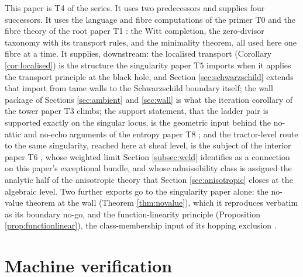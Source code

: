 \documentclass[11pt]{article}
\theoremstyle{definition}
\begin{document}
This paper is T4 of the series. It uses two predecessors and supplies four successors. It uses the language and fibre computations of the primer T0 \cite{ButlerT0} and the fibre theory of the root paper T1 \cite{ButlerT1}: the Witt completion, the zero-divisor taxonomy with its transport rules, and the minimality theorem, all used here one fibre at a time. It supplies, downstream: the localised transport (Corollary \ref{cor:localised}) is the structure the singularity paper T5 \cite{ButlerT5} imports when it applies the transport principle at the black hole, and Section \ref{sec:schwarzschild} extends that import from tame walls to the Schwarzschild boundary itself; the wall package of Sections \ref{sec:ambient} and \ref{sec:wall} is what the iteration corollary of the tower paper T3 \cite{ButlerT3} climbs; the support statement, that the ladder pair is supported exactly on the singular locus, is the geometric input behind the no-attic and no-echo arguments of the entropy paper T8 \cite{ButlerT8}; and the tractor-level route to the same singularity, reached here at sheaf level, is the subject of the interior paper T6 \cite{ButlerT6}, whose weighted limit Section \ref{subsec:weld} identifies as a connection on this paper's exceptional bundle, and whose admissibility class is assigned the analytic half of the anisotropic theory that Section \ref{sec:anisotropic} closes at the algebraic level. Two further exports go to the singularity paper alone: the no-value theorem at the wall (Theorem \ref{thm:novalue}), which it reproduces verbatim as its boundary no-go, and the function-linearity principle (Proposition \ref{prop:functionlinear}), the class-membership input of its hopping exclusion \cite[Facts B.3, B.4]{ButlerT5}.

\section{Machine verification}\label{sec:verification}
\end{document}
